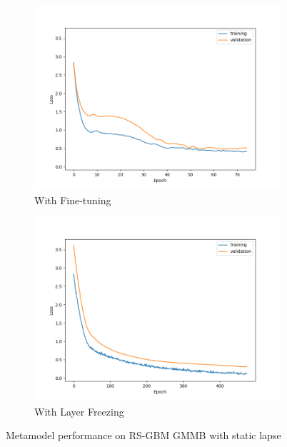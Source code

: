 \begin{figure}[ht!]
\begin{subfigure}{0.48\textwidth}
        \includegraphics[width=\textwidth]{./project3/figures/figure1c.png}
        \caption{With Fine-tuning}
        \label{subfig3-1:fineTuning}
    \end{subfigure}\hfill
    \begin{subfigure}{0.48\textwidth}
        \includegraphics[width=\textwidth]{./project3/figures/figure1d.png}
        \caption{With Layer Freezing}
        \label{subfig3-1:layerFreezing}
    \end{subfigure}
    \caption{Metamodel performance on RS-GBM GMMB with static lapse}
    \label{fig3:figure1}
\end{figure}

